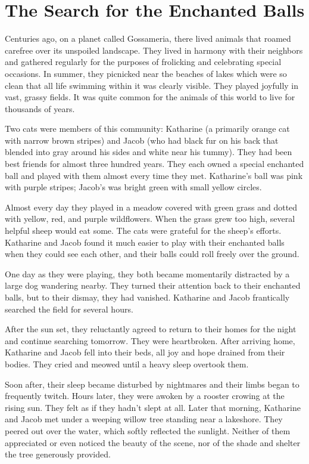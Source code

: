 \chapter{The Search for the Enchanted Balls}

Centuries ago, on a planet called Gossameria, there lived animals that roamed carefree over its unspoiled landscape. They lived in harmony with their neighbors and gathered regularly for the purposes of frolicking and celebrating special occasions. In summer, they picnicked near the beaches of lakes which were so clean that all life swimming within it was clearly visible. They played joyfully in vast, grassy fields. It was quite common for the animals of this world to live for thousands of years.

Two cats were members of this community: Katharine (a primarily orange cat with narrow brown stripes) and Jacob (who had black fur on his back that blended into gray around his sides and white near his tummy). They had been best friends for almost three hundred years. They each owned a special enchanted ball and played with them almost every time they met. Katharine's ball was pink with purple stripes; Jacob's was bright green with small yellow circles.

Almost every day they played in a meadow covered with green grass and dotted with yellow, red, and purple wildflowers. When the grass grew too high, several helpful sheep would eat some. The cats were grateful for the sheep’s efforts. Katharine and Jacob found it much easier to play with their enchanted balls when they could see each other, and their balls could roll freely over the ground.

One day as they were playing, they both became momentarily distracted by a large dog wandering nearby. They turned their attention back to their enchanted balls, but to their dismay, they had vanished. Katharine and Jacob frantically searched the field for several hours.

After the sun set, they reluctantly agreed to return to their homes for the night and continue searching tomorrow. They were heartbroken. After arriving home, Katharine and Jacob fell into their beds, all joy and hope drained from their bodies. They cried and meowed until a heavy sleep overtook them.

Soon after, their sleep became disturbed by nightmares and their limbs began to frequently twitch. Hours later, they were awoken by a rooster crowing at the rising sun. They felt as if they hadn't slept at all. Later that morning, Katharine and Jacob met under a weeping willow tree standing near a lakeshore. They peered out over the water, which softly reflected the sunlight. Neither of them appreciated or even noticed the beauty of the scene, nor of the shade and shelter the tree generously provided.

